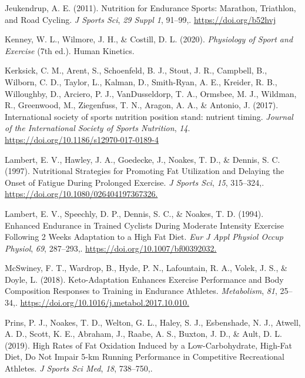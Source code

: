 \documentclass[]{cik}%
\newlength{\cslhangindent}
\newlength{\cslentryspacingunit} %
\newenvironment{CSLReferences}[2] %
 {%
  \setlength{\parindent}{0pt}
  \ifodd #1
  \let\oldpar\par
  \def\par{\hangindent=\cslhangindent\oldpar}
  \fi
  \setlength{\parskip}{#2\cslentryspacingunit}
 }%
 {}
\begin{document}
\begin{CSLReferences}{1}{0}
\leavevmode{}%
Jeukendrup, A. E. (2011). Nutrition for Endurance Sports: Marathon,
Triathlon, and Road Cycling. \emph{J Sports Sci}, \emph{29 Suppl 1},
91--99,. \url{https://doi.org/b52hvj}

\leavevmode{}%
Kenney, W. L., Wilmore, J. H., \& Costill, D. L. (2020).
\emph{Physiology of Sport and Exercise} (7th ed.). Human Kinetics.

\leavevmode{}%
Kerksick, C. M., Arent, S., Schoenfeld, B. J., Stout, J. R., Campbell,
B., Wilborn, C. D., Taylor, L., Kalman, D., Smith-Ryan, A. E., Kreider,
R. B., Willoughby, D., Arciero, P. J., VanDusseldorp, T. A., Ormsbee, M.
J., Wildman, R., Greenwood, M., Ziegenfuss, T. N., Aragon, A. A., \&
Antonio, J. (2017). International society of sports nutrition position
stand: nutrient timing. \emph{Journal of the International Society of
Sports Nutrition}, \emph{14}.
\url{https://doi.org/10.1186/s12970-017-0189-4}

\leavevmode{}%
Lambert, E. V., Hawley, J. A., Goedecke, J., Noakes, T. D., \& Dennis,
S. C. (1997). Nutritional Strategies for Promoting Fat Utilization and
Delaying the Onset of Fatigue During Prolonged Exercise. \emph{J Sports
Sci}, \emph{15}, 315--324,.
\url{https://doi.org/10.1080/026404197367326.}

\leavevmode{}%
Lambert, E. V., Speechly, D. P., Dennis, S. C., \& Noakes, T. D. (1994).
Enhanced Endurance in Trained Cyclists During Moderate Intensity
Exercise Following 2 Weeks Adaptation to a High Fat Diet. \emph{Eur J
Appl Physiol Occup Physiol}, \emph{69}, 287--293,.
\url{https://doi.org/10.1007/bf00392032.}

\leavevmode{}%
McSwiney, F. T., Wardrop, B., Hyde, P. N., Lafountain, R. A., Volek, J.
S., \& Doyle, L. (2018). Keto-Adaptation Enhances Exercise Performance
and Body Composition Responses to Training in Endurance Athletes.
\emph{Metabolism}, \emph{81}, 25--34,.
\url{https://doi.org/10.1016/j.metabol.2017.10.010.}

\leavevmode{}%
Prins, P. J., Noakes, T. D., Welton, G. L., Haley, S. J., Esbenshade, N.
J., Atwell, A. D., Scott, K. E., Abraham, J., Raabe, A. S., Buxton, J.
D., \& Ault, D. L. (2019). High Rates of Fat Oxidation Induced by a
Low-Carbohydrate, High-Fat Diet, Do Not Impair 5-km Running Performance
in Competitive Recreational Athletes. \emph{J Sports Sci Med},
\emph{18}, 738--750,.


\end{CSLReferences}
\end{document}
